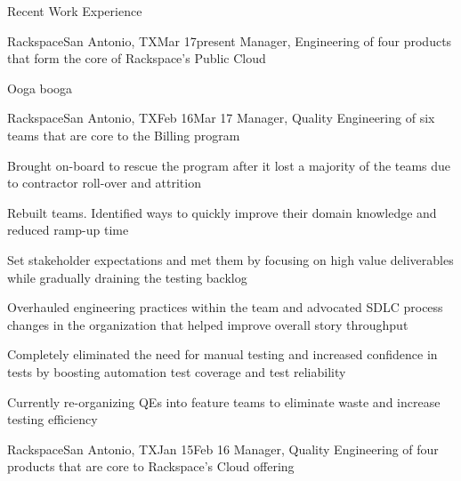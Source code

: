 \documentclass{resume} %
\begin{document}
\begin{rSection}{Recent Work Experience}

\begin{rSubsection}{Rackspace}{San Antonio, TX}{Mar 17}{present}
{Manager, Engineering of four products that form the core of Rackspace's Public Cloud}
  
\item Ooga booga
  
\end{rSubsection}
  
\begin{rSubsection}{Rackspace}{San Antonio, TX}{Feb 16}{Mar 17}
{Manager, Quality Engineering of six teams that are core to the Billing program}
  
\item Brought on-board to rescue the program after it lost a majority of the teams due to contractor roll-over and attrition
\item Rebuilt teams. Identified ways to quickly improve their domain knowledge and reduced ramp-up time
\item Set stakeholder expectations and met them by focusing on high value deliverables while gradually draining the testing backlog
\item Overhauled engineering practices within the team and advocated SDLC process changes in the organization that helped improve overall story throughput
\item Completely eliminated the need for manual testing and increased confidence in tests by boosting automation test coverage and test reliability
\item Currently re-organizing QEs into feature teams to eliminate waste and increase testing efficiency
  
\end{rSubsection}
    
\begin{rSubsection}{Rackspace}{San Antonio, TX}{Jan 15}{Feb 16}
{Manager, Quality Engineering of four products that are core to Rackspace's Cloud offering}


\end{rSubsection}
\end{rSection}
\end{document}

